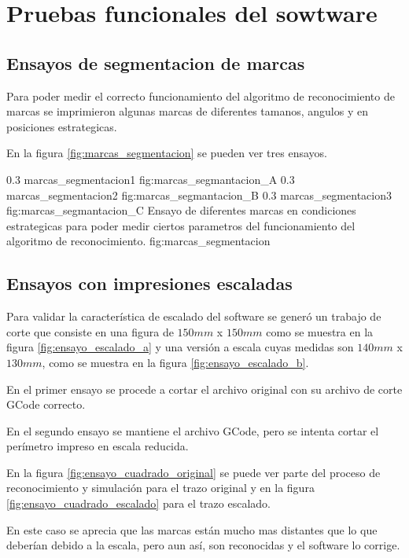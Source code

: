 \section{Pruebas funcionales del sowtware}
\label{sec:pruebasHW}

\subsection{Ensayos de segmentacion de marcas}
Para poder medir el correcto funcionamiento del algoritmo de reconocimiento de marcas se imprimieron algunas marcas de diferentes tamanos, angulos y en posiciones estrategicas.\par
En la figura \ref{fig:marcas_segmentacion} se pueden ver tres ensayos.

   \subfigabc
   {0.3} {marcas_segmentacion1} {} {fig:marcas_segmantacion_A}
   {0.3} {marcas_segmentacion2} {} {fig:marcas_segmantacion_B}
   {0.3} {marcas_segmentacion3} {} {fig:marcas_segmantacion_C}
   {Ensayo de diferentes marcas en condiciones estrategicas para poder medir ciertos parametros del funcionamiento del algoritmo de reconocimiento.}
   {fig:marcas_segmentacion}


\subsection{Ensayos con impresiones escaladas}

Para validar la característica de escalado del software se generó un trabajo de corte que consiste en una figura de $150mm$ x $150mm$ como se muestra en la figura \ref{fig:ensayo_escalado_a} y una versión a escala cuyas medidas son $140mm$ x $130mm$, como se muestra en la figura \ref{fig:ensayo_escalado_b}.\par
   En el primer ensayo se procede a cortar el archivo original con su archivo de corte GCode correcto. \par
   En el segundo ensayo se mantiene el archivo GCode, pero se intenta cortar el perímetro impreso en escala reducida.\par
   En la figura \ref{fig:ensayo_cuadrado_original} se puede ver parte del proceso de reconocimiento y simulación para el trazo original y en la figura \ref{fig:ensayo_cuadrado_escalado} para el trazo escalado.\par
   En este caso se aprecia que las marcas están mucho mas distantes que lo que deberían debido a la escala, pero aun así, son reconocidas y el software lo corrige.
   
